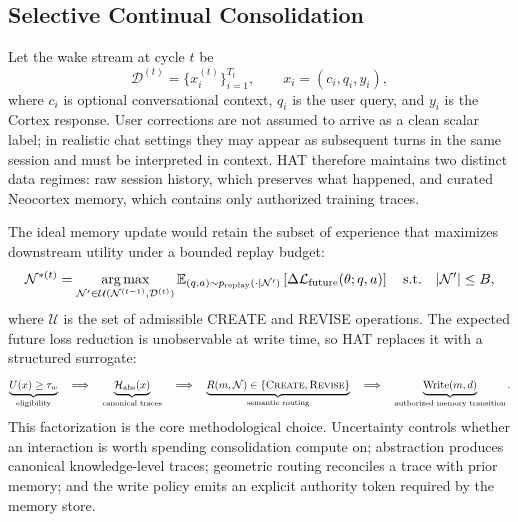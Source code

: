 \subsection{Selective Continual Consolidation}
\label{sec:method:formulation}

Let the wake stream at cycle $t$ be
\begin{equation}
  \mathcal{D}^{(t)} = \{x_i^{(t)}\}_{i=1}^{T_t},
  \qquad
  x_i = (c_i, q_i, y_i),
  \label{eq:wake_stream}
\end{equation}
where $c_i$ is optional conversational context, $q_i$ is the user query, and $y_i$ is the Cortex response.
User corrections are not assumed to arrive as a clean scalar label; in realistic chat settings they may appear as subsequent turns in the same session and must be interpreted in context.
HAT therefore maintains two distinct data regimes: raw session history, which preserves what happened, and curated Neocortex memory, which contains only authorized training traces.

The ideal memory update would retain the subset of experience that maximizes downstream utility under a bounded replay budget:
\begin{equation}
  \mathcal{N}^{*(t)}
  =
  \operatorname*{arg\,max}_{\mathcal{N}' \in \mathcal{U}(\mathcal{N}^{(t-1)},\mathcal{D}^{(t)})}
  \mathbb{E}_{(q,a)\sim p_{\mathrm{replay}}(\cdot\mid\mathcal{N}')}
  \left[
    \Delta \mathcal{L}_{\mathrm{future}}(\theta; q,a)
  \right]
  \quad
  \mathrm{s.t.}\quad |\mathcal{N}'| \le B,
  \label{eq:ideal_memory_update}
\end{equation}
where $\mathcal{U}$ is the set of admissible CREATE and REVISE operations.
The expected future loss reduction is unobservable at write time, so HAT replaces it with a structured surrogate:
\begin{equation}
  \underbrace{U(x)\ge\tau_w}_{\text{eligibility}}
  \quad\Longrightarrow\quad
  \underbrace{\mathcal{H}_{\mathrm{abs}}(x)}_{\text{canonical traces}}
  \quad\Longrightarrow\quad
  \underbrace{R(m,\mathcal{N})\in\{\textsc{Create},\textsc{Revise}\}}_{\text{semantic routing}}
  \quad\Longrightarrow\quad
  \underbrace{\mathrm{Write}(m,d)}_{\text{authorized memory transition}}.
  \label{eq:surrogate_pipeline}
\end{equation}
This factorization is the core methodological choice.
Uncertainty controls whether an interaction is worth spending consolidation compute on; abstraction produces canonical knowledge-level traces; geometric routing reconciles a trace with prior memory; and the write policy emits an explicit authority token required by the memory store.

